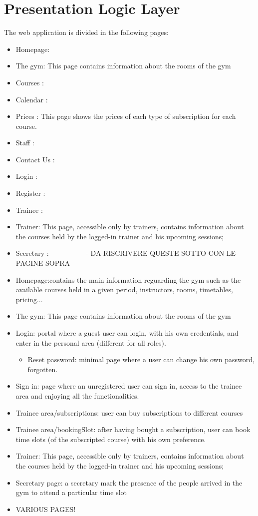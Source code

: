 \section{Presentation Logic Layer}


The web application is divided in the following pages:
\begin{itemize}
	\item Homepage: 
	\item The gym: This page contains information about the rooms of the gym
	\item Courses :
	\item Calendar :
	\item Prices : This page shows the prices of each type of subscription for each course.
	\item Staff :
	\item Contact Us :
	\item Login :
	\item Register :
	\item Trainee :
	\item Trainer: This page, accessible only by trainers, contains information about the courses held by the logged-in trainer and his upcoming sessions;
	\item Secretary :
	---------------- DA RISCRIVERE QUESTE SOTTO CON LE PAGINE SOPRA--------------
	\item Homepage:contains the main information reguarding the gym such as the available courses held in a given period, instructors, rooms, timetables, pricing...
	\item The gym: This page contains information about the rooms of the gym
	\item Login: portal where a guest user can login, with his own credentials, and enter in the personal area (different for all roles).
	\begin{itemize}
		\item Reset password: minimal page where a user can change his own password, forgotten.
	\end{itemize}
	\item Sign in: page where an unregistered user can sign in, access to the trainee area and enjoying all the functionalities.
	\item Trainee area/subscriptions: user can buy subscriptions to different courses
	\item Trainee area/bookingSlot: after having bought a subscription, user can book time slots (of the subscripted course) with his own preference.
	\item Trainer: This page, accessible only by trainers, contains information about the courses held by the logged-in trainer and his upcoming sessions;
	\item Secretary page: a secretary mark the presence of the people arrived in the gym to attend a particular time slot

	\item VARIOUS PAGES!
\end{itemize}

